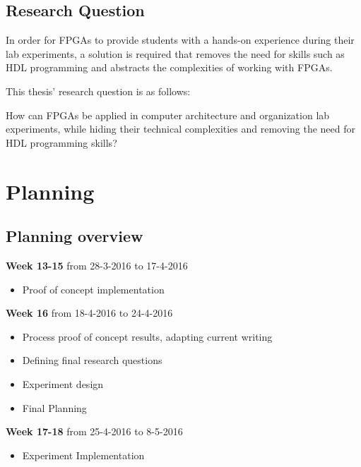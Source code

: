 \documentclass[singleside,openright]{uva-bachelor-thesis}
\newenvironment{week}[3]{
\newcommand{\topic}{\item}
\vspace{2mm} %
\noindent
\textbf{Week #1} from #2 to #3
\begin{itemize}[nolistsep]
}{
\end{itemize}
}
\begin{document}
\section{Research Question}

In order for FPGAs to provide students with a hands-on experience during their lab experiments, a solution is required 
that removes the need for skills such as HDL programming and abstracts the complexities of working with FPGAs.

This thesis' research question is as follows: 

\begin{displayquote}
How can FPGAs be applied in computer architecture and organization lab experiments, while hiding their technical complexities and removing the need for HDL programming skills?
\end{displayquote}



\chapter{Planning}


\section{Planning overview}
\begin{week}{13-15}{28-3-2016}{17-4-2016}
\topic Proof of concept implementation
\end{week}

\begin{week}{16}{18-4-2016}{24-4-2016}
\topic Process proof of concept results, adapting current writing
\topic Defining final research questions
\topic Experiment design
\topic Final Planning
\end{week}

\begin{week}{17-18}{25-4-2016}{8-5-2016}
\topic Experiment Implementation
\end{week}
\end{document}
